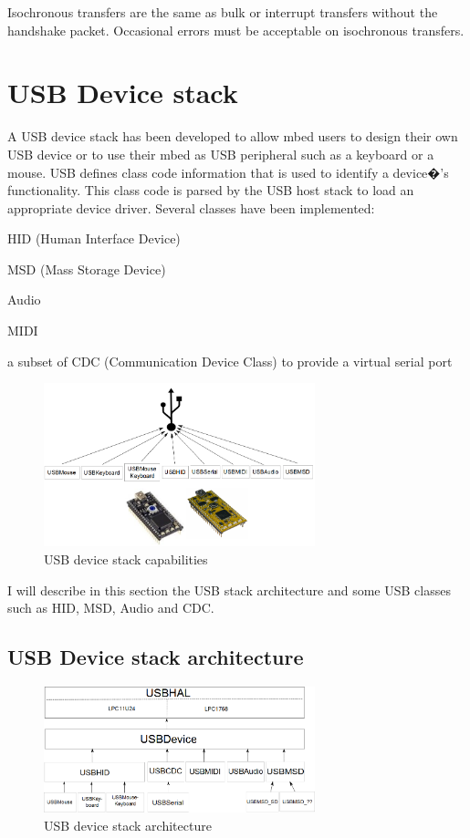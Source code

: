\documentclass[pdftex,10pt,a4paper]{report}
\newenvironment{packed_item}{
\begin{itemize}
  \setlength{\itemsep}{1pt}
  \setlength{\parskip}{0pt}
  \setlength{\parsep}{0pt}
}{\end{itemize}}
\begin{document}
Isochronous transfers are the same as bulk or interrupt transfers without the handshake packet. Occasional errors must be acceptable on isochronous transfers.



\newpage
\section{USB Device stack}
A USB device stack has been developed to allow mbed users to design their own USB device or to use their mbed as USB peripheral such as a keyboard or a mouse. USB defines class code information that is used to identify a device�'s functionality. This class code is parsed by the USB host stack to load an appropriate device driver. Several classes have been implemented:
\begin{packed_item}
	\item HID (Human Interface Device)
	\item MSD (Mass Storage Device)
	\item Audio
	\item MIDI
	\item a subset of CDC (Communication Device Class) to provide a virtual serial port
\end{packed_item}

\begin{figure}[h!]
		\centering
		\includegraphics[width=0.7\textwidth]{./usb_capa1.png}
		\caption{USB device stack capabilities}
		\label{USB device stack capabilities}
\end{figure}

I will describe in this section the USB stack architecture and some USB classes such as HID, MSD, Audio and CDC.


\subsection{USB Device stack architecture}
\begin{figure}[h!]
		\centering
		\includegraphics[width=0.7\textwidth]{./usb_arch3.png}
		\caption{USB device stack architecture}
		\label{USB device stack architecture}
\end{figure}
\end{document}
